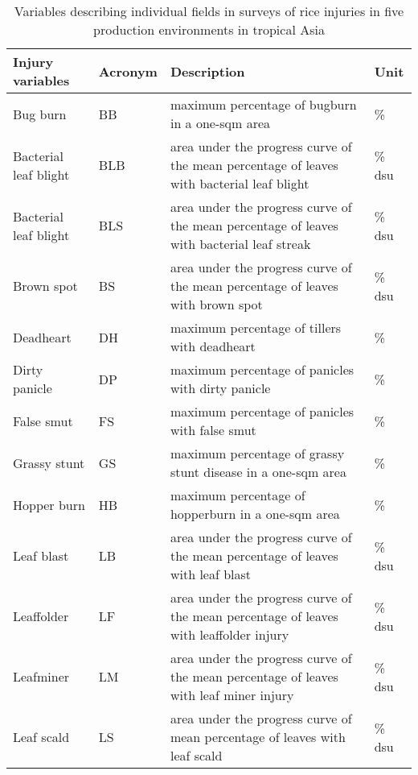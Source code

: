 \begin{table}[!h]
\centering
\caption{Variables describing individual fields in surveys of rice injuries in five production environments in tropical Asia}
\label{table:variable_des}
\begin{tabular}{llll}
\hline
Injury variables              & Acronym & Description                                                                              & Unit  \\
\hline
Bug burn              & BB      & maximum percentage of bugburn in a one-sqm area                                           & \%     \\
Bacterial leaf blight & BLB     & area under the progress curve of the mean percentage of leaves with bacterial leaf blight & \% dsu \\
Bacterial leaf blight & BLS     & area under the progress curve of the mean percentage of leaves with bacterial leaf streak & \% dsu \\
Brown spot            & BS      & area under the progress curve of the mean percentage of leaves with brown spot            & \% dsu \\
Deadheart             & DH      & maximum percentage of tillers with deadheart                                              & \%     \\
Dirty panicle         & DP      & maximum percentage of panicles with dirty panicle                                         & \%     \\
False smut            & FS      & maximum percentage of panicles with false smut                                            & \%     \\
Grassy stunt   & GS      & maximum percentage of grassy stunt disease in a one-sqm area                              & \%     \\
Hopper burn           & HB      & maximum percentage of hopperburn in a one-sqm area                                        & \%     \\
Leaf blast            & LB      & area under the progress curve of the mean percentage of leaves with leaf blast            & \% dsu \\
Leaffolder            & LF      & area under the progress curve of the mean percentage of leaves with leaffolder injury     & \% dsu \\
Leafminer             & LM      & area under the progress curve of the mean percentage of leaves with leaf miner injury     & \% dsu \\
Leaf scald            & LS      & area under the progress curve of mean percentage of leaves with leaf scald                & \% dsu \\

\end{tabular}
\end{table}

